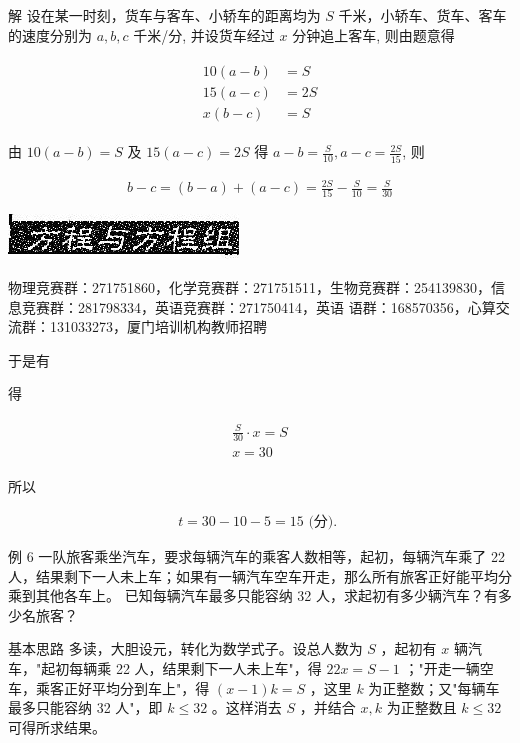 \documentclass[10pt]{article}
\begin{document}
解 设在某一时刻，货车与客车、小轿车的距离均为 $S$ 千米，小轿车、货车、客车的速度分别为 $a, b, c$ 千米/分, 并设货车经过 $x$ 分钟追上客车, 则由题意得

\begin{align*}
\begin{aligned}
10(a-b) & =S \\
15(a-c) & =2 S \\
x(b-c) & =S
\end{aligned}
\end{align*}

由 $10(a-b)=S$ 及 $15(a-c)=2 S$ 得 $a-b=\frac{S}{10}, a-c=\frac{2 S}{15}$, 则

\begin{align*}
b-c=(b-a)+(a-c)=\frac{2 S}{15}-\frac{S}{10}=\frac{S}{30}
\end{align*}

\begin{center}
\includegraphics[max width=\textwidth]{2024_10_30_26b590fd1106d28139f0g-022}
\end{center}

物理竞赛群：271751860，化学竞赛群：271751511，生物竞赛群：254139830，信息竞赛群：281798334，英语竞赛群：271750414，英语 语群：168570356，心算交流群：131033273，厦门培训机构教师招聘

于是有

得

\begin{align*}
\begin{gathered}
\frac{S}{30} \cdot x=S \\
x=30
\end{gathered}
\end{align*}

所以

\begin{align*}
t=30-10-5=15 \text { (分). }
\end{align*}

例 6 一队旅客乘坐汽车，要求每辆汽车的乘客人数相等，起初，每辆汽车乘了 22 人，结果剩下一人未上车；如果有一辆汽车空车开走，那么所有旅客正好能平均分乘到其他各车上。 已知每辆汽车最多只能容纳 32 人，求起初有多少辆汽车？有多少名旅客？

基本思路 多读，大胆设元，转化为数学式子。设总人数为 $S$ ，起初有 $x$ 辆汽车，"起初每辆乘 22 人，结果剩下一人未上车"，得 $22 x=S-1$ ；"开走一辆空车，乘客正好平均分到车上"，得 $(x-1) k=S$ ，这里 $k$ 为正整数；又"每辆车最多只能容纳 32 人"，即 $k \leqslant 32$ 。这样消去 $S$ ，并结合 $x, k$ 为正整数且 $k \leqslant 32$可得所求结果。
\end{document}
